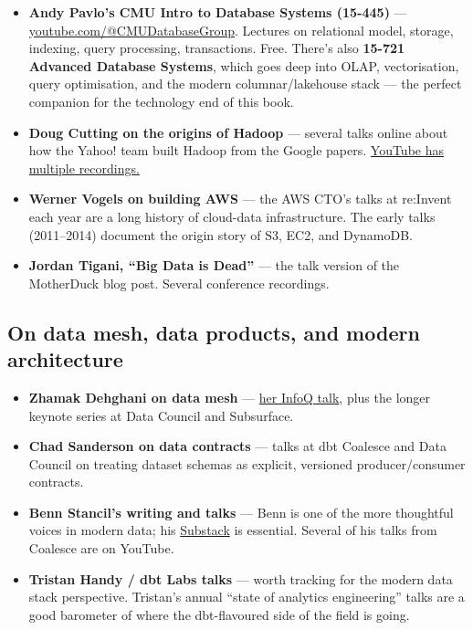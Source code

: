 \begin{itemize}[leftmargin=*]
  \item \textbf{Andy Pavlo's CMU Intro to Database Systems (15-445)} --- \href{https://www.youtube.com/@CMUDatabaseGroup}{youtube.com/@CMUDatabaseGroup}. Lectures on relational model, storage, indexing, query processing, transactions. Free. There's also \textbf{15-721 Advanced Database Systems}, which goes deep into OLAP, vectorisation, query optimisation, and the modern columnar/lakehouse stack — the perfect companion for the technology end of this book.
  \item \textbf{Doug Cutting on the origins of Hadoop} --- several talks online about how the Yahoo! team built Hadoop from the Google papers. \href{https://www.youtube.com/results?search_query=doug+cutting+hadoop}{YouTube has multiple recordings.}
  \item \textbf{Werner Vogels on building AWS} --- the AWS CTO's talks at re:Invent each year are a long history of cloud-data infrastructure. The early talks (2011--2014) document the origin story of S3, EC2, and DynamoDB.
  \item \textbf{Jordan Tigani, ``Big Data is Dead''} --- the talk version of the MotherDuck blog post. Several conference recordings.
\end{itemize}

\subsection*{On data mesh, data products, and modern architecture}

\begin{itemize}[leftmargin=*]
  \item \textbf{Zhamak Dehghani on data mesh} --- \href{https://www.youtube.com/watch?v=TVxdW2gG3X8}{her InfoQ talk}, plus the longer keynote series at Data Council and Subsurface.
  \item \textbf{Chad Sanderson on data contracts} --- talks at dbt Coalesce and Data Council on treating dataset schemas as explicit, versioned producer/consumer contracts.
  \item \textbf{Benn Stancil's writing and talks} --- Benn is one of the more thoughtful voices in modern data; his \href{https://benn.substack.com/}{Substack} is essential. Several of his talks from Coalesce are on YouTube.
  \item \textbf{Tristan Handy / dbt Labs talks} --- worth tracking for the modern data stack perspective. Tristan's annual ``state of analytics engineering'' talks are a good barometer of where the dbt-flavoured side of the field is going.
\end{itemize}

